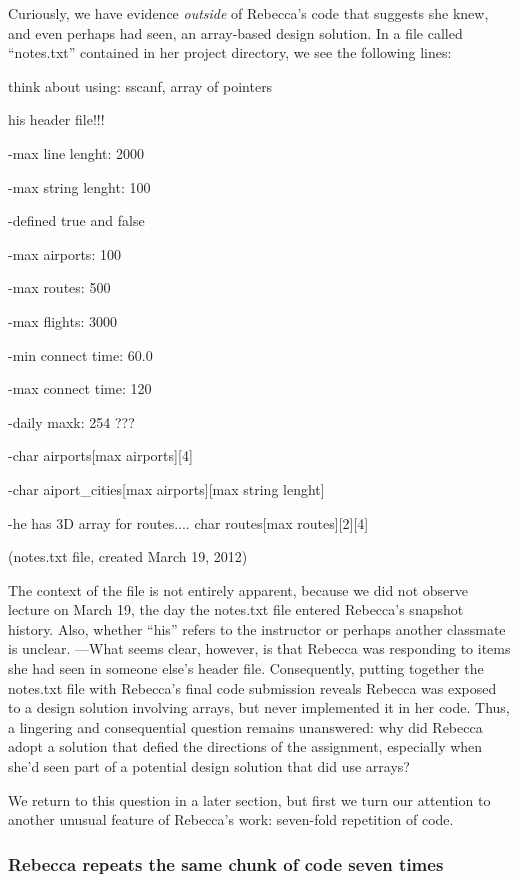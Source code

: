 Curiously, we have evidence \emph{outside} of Rebecca's code that
suggests she knew, and even perhaps had seen, an array-based design
solution. In a file called ``notes.txt'' contained in her project
directory, we see the following lines:

think about using: sscanf, array of pointers

his header file!!!

-max line lenght: 2000

-max string lenght: 100

-defined true and false

-max airports: 100

-max routes: 500

-max flights: 3000

-min connect time: 60.0

-max connect time: 120

-daily maxk: 254 ???

-char airports{[}max airports{]}{[}4{]}

-char aiport\_cities{[}max airports{]}{[}max string lenght{]}

-he has 3D array for routes.... char routes{[}max
routes{]}{[}2{]}{[}4{]}

(notes.txt file, created March 19, 2012)

The context of the file is not entirely apparent, because we did not
observe lecture on March 19, the day the notes.txt file entered
Rebecca's snapshot history. Also, whether ``his'' refers to the
instructor or perhaps another classmate is unclear. ---What seems clear,
however, is that Rebecca was responding to items she had seen in someone
else's header file. Consequently, putting together the notes.txt file
with Rebecca's final code submission reveals Rebecca was exposed to a
design solution involving arrays, but never implemented it in her code.
Thus, a lingering and consequential question remains unanswered: why did
Rebecca adopt a solution that defied the directions of the assignment,
especially when she'd seen part of a potential design solution that did
use arrays?

We return to this question in a later section, but first we turn our
attention to another unusual feature of Rebecca's work: seven-fold
repetition of code.

\subsubsection{Rebecca repeats the same chunk of code seven
times}\label{rebecca-repeats-the-same-chunk-of-code-seven-times}

